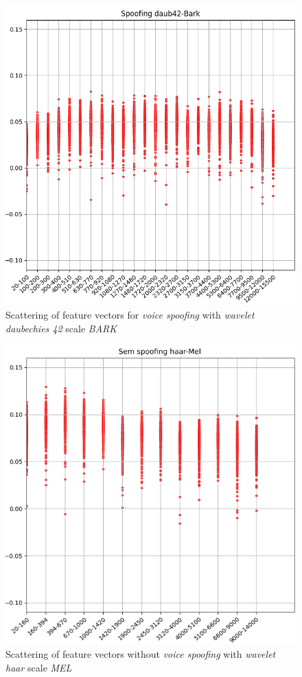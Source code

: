 		\begin{figure}[!h]
			\centering
			\includegraphics[width=.70\linewidth, height=.68\linewidth]{images/results/barkVersusMel/spoofingDaub42Bark}
			\caption{Scattering of feature vectors for \textit{voice spoofing} with \textit{wavelet daubechies 42} scale \textit{BARK}}
			\label{fig:spoofingdaub42bark}
		\end{figure}
		
		\begin{figure}[!h]
			\centering
			\includegraphics[width=.70\linewidth, height=.68\linewidth]{images/results/barkVersusMel/liveHaarMel}
			\caption{Scattering of feature vectors without \textit{voice spoofing} with \textit{wavelet haar} scale \textit{MEL}}
			\label{fig:livehaarmel}
		\end{figure}
		
